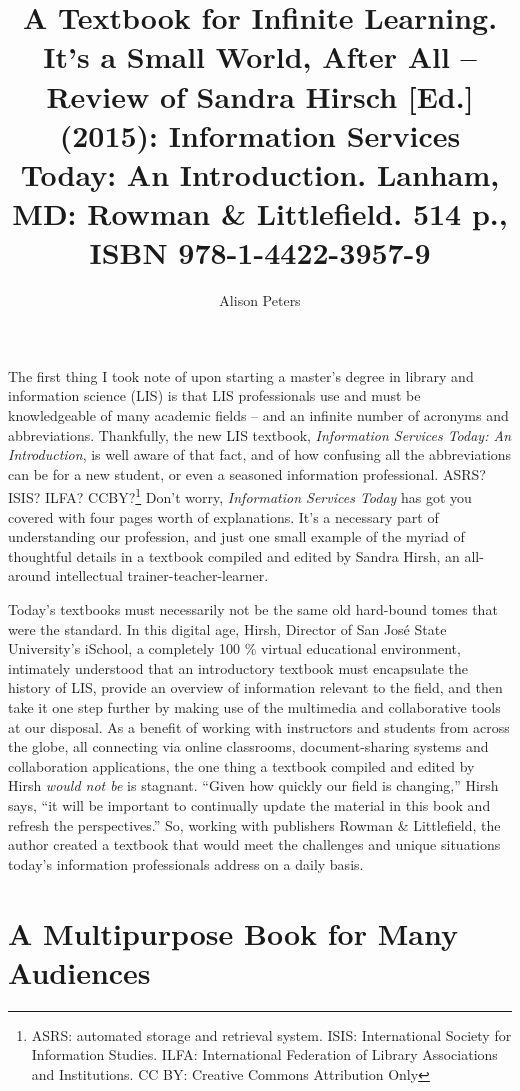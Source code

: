 \documentclass[a4paper,
fontsize=11pt,
oneside,
numbers=noperiodatend,
parskip=half-,
bibliography=totoc,
final
]{scrartcl}
\title{\LARGE{A Textbook for Infinite Learning. It’s a Small World, After All – Review of Sandra Hirsch [Ed.] (2015): Information Services Today: An Introduction. Lanham, MD: Rowman \& Littlefield. 514 p., ISBN 978-1-4422-3957-9}} %
\author{Alison Peters} %
\date{}
\begin{document}
\maketitle
\thispagestyle{fancyplain} 


The first thing I took note of upon starting a master's degree in
library and information science (LIS) is that LIS professionals use and
must be knowledgeable of many academic fields -- and an infinite number
of acronyms and abbreviations. Thankfully, the new LIS textbook,
\emph{Information Services Today: An Introduction}, is well aware of
that fact, and of how confusing all the abbreviations can be for a new
student, or even a seasoned information professional. ASRS? ISIS? ILFA?
CCBY?\footnote{ASRS: automated storage and retrieval system. ISIS:
  International Society for Information Studies. ILFA: International
  Federation of Library Associations and Institutions. CC BY: Creative
  Commons Attribution Only} Don't worry, \emph{Information Services
Today} has got you covered with four pages worth of explanations. It's a
necessary part of understanding our profession, and just one small
example of the myriad of thoughtful details in a textbook compiled and
edited by Sandra Hirsh, an all-around intellectual
trainer-teacher-learner.

Today's textbooks must necessarily not be the same old hard-bound tomes
that were the standard. In this digital age, Hirsh, Director of San José
State University's iSchool, a completely 100 \% virtual educational
environment, intimately understood that an introductory textbook must
encapsulate the history of LIS, provide an overview of information
relevant to the field, and then take it one step further by making use
of the multimedia and collaborative tools at our disposal. As a benefit
of working with instructors and students from across the globe, all
connecting via online classrooms, document-sharing systems and
collaboration applications, the one thing a textbook compiled and edited
by Hirsh \emph{would not be} is stagnant. \enquote{Given how quickly our
field is changing,} Hirsh says, \enquote{it will be important to
continually update the material in this book and refresh the
perspectives.} So, working with publishers Rowman \& Littlefield, the
author created a textbook that would meet the challenges and unique
situations today's information professionals address on a daily basis.

\section*{A Multipurpose Book for Many
Audiences}\label{a-multipurpose-book-for-many-audiences}
\end{document}
